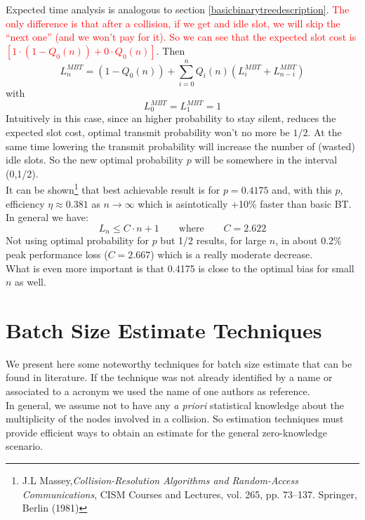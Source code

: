 \documentclass[12pt,a4paper]{report}
\begin{document}
Expected time analysis is analogous  to section \ref{basicbinarytreedescription}. \textcolor{red}{The only difference is that after a collision, if we get and idle slot, we will skip the ``next one'' (and we won't pay for it). So we can see that the expected slot cost is $\left[1 \cdot (1-Q_{0}(n))+ 0\cdot Q_{0}(n)\right]$}. Then\\
\begin{equation}
L_{n}^{MBT} = \left(1 - Q_{0}(n)\right)+\sum_{i=0}^{n} Q_{i}(n) (L_{i}^{MBT}+L_{n-i}^{MBT})
\end{equation}
with
\begin{equation*}
L_{0}^{MBT} = L_{1}^{MBT}  = 1
\end{equation*}
Intuitively in this case, since an higher probability to stay silent, reduces the expected slot cost, optimal transmit probability won't no more be $1/2$. At the same time lowering the transmit probability will increase the number of (wasted) idle slots. So the new optimal probability $p$ will be somewhere in the interval (0,1/2).\\
It can be shown\footnote{  J.L Massey,\emph{Collision-Resolution Algorithms and Random-Access Communications}, CISM Courses and Lectures, vol. 265, pp. 73–137. Springer, Berlin (1981)} that best achievable result is for $p=0.4175$ and, with this $p$, efficiency $\eta \approx 0.381$ as $n \to \infty$ which is asintotically +10\% faster than basic BT.\\
In general we have: 
\begin{equation}
L_{n}\leq C \cdot n +1 \qquad \textrm{where} \qquad C=2.622
\end{equation}
Not using optimal probability for $p$ but 1/2 results, for large $n$, in about 0.2\% peak performance loss  ($C=2.667$) which is a really moderate decrease.\\
What is even more important  is that 0.4175 is close to the optimal bias for small $n$ as well.
\chapter{Batch Size Estimate Techniques}
We present here some noteworthy techniques for batch size estimate that can be found in literature.
If the technique was not already identified by a name or associated to a acronym we used the name of one authors as reference.\\

In general, we assume not to have any \emph{a priori} statistical knowledge about the multiplicity of the nodes involved in a collision. So estimation techniques must provide efficient ways to obtain an estimate for the general zero-knowledge scenario.\\
\end{document}
